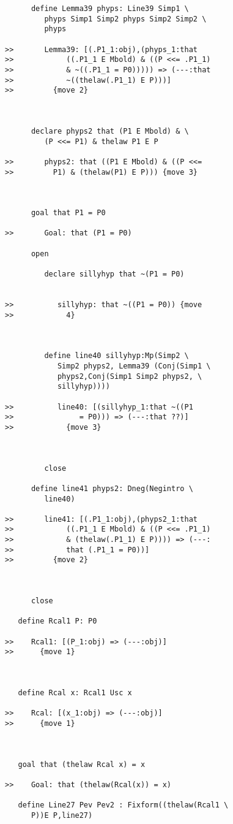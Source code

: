 \documentclass[12pt]{article}
\begin{document}
\begin{verbatim}
      define Lemma39 phyps: Line39 Simp1 \
         phyps Simp1 Simp2 phyps Simp2 Simp2 \
         phyps

>>       Lemma39: [(.P1_1:obj),(phyps_1:that
>>            ((.P1_1 E Mbold) & ((P <<= .P1_1)
>>            & ~((.P1_1 = P0))))) => (---:that
>>            ~((thelaw(.P1_1) E P)))]
>>         {move 2}



      declare phyps2 that (P1 E Mbold) & \
         (P <<= P1) & thelaw P1 E P

>>       phyps2: that ((P1 E Mbold) & ((P <<=
>>         P1) & (thelaw(P1) E P))) {move 3}



      goal that P1 = P0

>>       Goal: that (P1 = P0)

      open

         declare sillyhyp that ~(P1 = P0)


>>          sillyhyp: that ~((P1 = P0)) {move
>>            4}



         define line40 sillyhyp:Mp(Simp2 \
            Simp2 phyps2, Lemma39 (Conj(Simp1 \
            phyps2,Conj(Simp1 Simp2 phyps2, \
            sillyhyp))))

>>          line40: [(sillyhyp_1:that ~((P1
>>               = P0))) => (---:that ??)]
>>            {move 3}



         close

      define line41 phyps2: Dneg(Negintro \
         line40)

>>       line41: [(.P1_1:obj),(phyps2_1:that
>>            ((.P1_1 E Mbold) & ((P <<= .P1_1)
>>            & (thelaw(.P1_1) E P)))) => (---:
>>            that (.P1_1 = P0))]
>>         {move 2}



      close

   define Rcal1 P: P0

>>    Rcal1: [(P_1:obj) => (---:obj)]
>>      {move 1}



   define Rcal x: Rcal1 Usc x

>>    Rcal: [(x_1:obj) => (---:obj)]
>>      {move 1}



   goal that (thelaw Rcal x) = x

>>    Goal: that (thelaw(Rcal(x)) = x)

   define Line27 Pev Pev2 : Fixform((thelaw(Rcal1 \
      P))E P,line27)


\end{verbatim}
\end{document}
